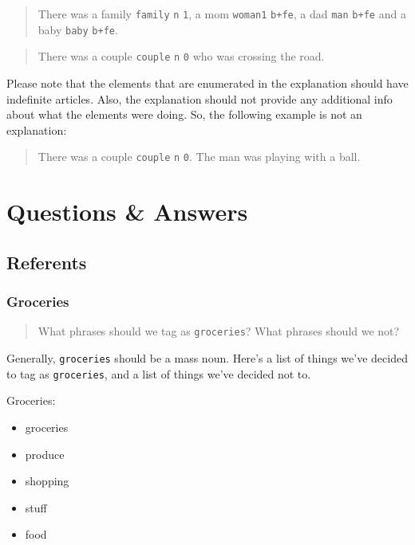 \documentclass[
]{book}
\providecommand{\tightlist}{%
  \setlength{\itemsep}{0pt}\setlength{\parskip}{0pt}}
\begin{document}
\begin{quote}
There was a family \texttt{family} \texttt{n} \texttt{1}, a mom \texttt{woman1} \texttt{b+fe}, a dad \texttt{man} \texttt{b+fe} and a baby \texttt{baby} \texttt{b+fe}.
\end{quote}

\begin{quote}
There was a couple \texttt{couple} \texttt{n} \texttt{0} who was crossing the road.
\end{quote}

Please note that the elements that are enumerated in the explanation should have indefinite articles. Also, the explanation should not provide any additional info about what the elements were doing. So, the following example is not an explanation:

\begin{quote}
There was a couple \texttt{couple} \texttt{n} \texttt{0}. The man was playing with a ball.
\end{quote}

\hypertarget{questions-answers}{%
\chapter{Questions \& Answers}\label{questions-answers}}

\hypertarget{referents-1}{%
\section{Referents}\label{referents-1}}

\hypertarget{groceries}{%
\subsection{Groceries}\label{groceries}}

\begin{quote}
What phrases should we tag as \texttt{groceries}? What phrases should we not?
\end{quote}

Generally, \texttt{groceries} should be a mass noun.
Here's a list of things we've decided to tag as \texttt{groceries}, and a list of things we've decided not to.

Groceries:

\begin{itemize}
\tightlist
\item
  groceries
\item
  produce
\item
  shopping
\item
  stuff
\item
  food
\end{itemize}
\end{document}

